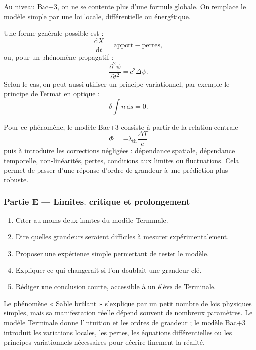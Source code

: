 \documentclass[11pt,a4paper]{article}
\begin{document}
\begin{approfondissementbox}
Au niveau Bac+3, on ne se contente plus d'une formule globale. On remplace le modèle simple par une loi locale, différentielle ou énergétique.

Une forme générale possible est :
\[
\frac{\mathrm d X}{\mathrm dt}=\text{apport}-\text{pertes},
\]
ou, pour un phénomène propagatif :
\[
\frac{\partial^2 \psi}{\partial t^2}=c^2\Delta\psi.
\]
Selon le cas, on peut aussi utiliser un principe variationnel, par exemple le principe de Fermat en optique :
\[
\delta \int n\,\mathrm ds=0.
\]

Pour ce phénomène, le modèle Bac+3 consiste à partir de la relation centrale
\[
\Phi=-\lambda_{\mathrm{th}}\frac{\Delta T}{e}
\]
puis à introduire les corrections négligées : dépendance spatiale, dépendance temporelle, non-linéarités, pertes, conditions aux limites ou fluctuations. Cela permet de passer d'une réponse d'ordre de grandeur à une prédiction plus robuste.
\end{approfondissementbox}

\subsubsection*{Partie E — Limites, critique et prolongement}

\begin{enumerate}
  \item Citer au moins deux limites du modèle Terminale.
  \item Dire quelles grandeurs seraient difficiles à mesurer expérimentalement.
  \item Proposer une expérience simple permettant de tester le modèle.
  \item Expliquer ce qui changerait si l'on doublait une grandeur clé.
  \item Rédiger une conclusion courte, accessible à un élève de Terminale.
\end{enumerate}

\begin{corrigebox}
Le phénomène « Sable brûlant » s'explique par un petit nombre de lois physiques simples, mais sa manifestation réelle dépend souvent de nombreux paramètres. Le modèle Terminale donne l'intuition et les ordres de grandeur ; le modèle Bac+3 introduit les variations locales, les pertes, les équations différentielles ou les principes variationnels nécessaires pour décrire finement la réalité.
\end{corrigebox}
\end{document}
